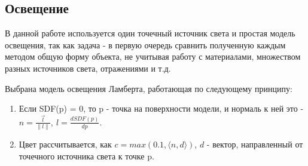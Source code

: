 \documentclass[a4paper,hidelinks,12pt]{article}
\begin{document}
\newpage

\subsection{Освещение}
В данной работе используется один точечный источник света и простая модель освещения, так как задача - в первую очередь сравнить полученную каждым методом общую форму
объекта, не учитывая работу с материалами, множеством разных источников света, отражениями и т.д.

\medskip

Выбрана модель освещения Ламберта, работающая по следующему принципу:
\begin{enumerate}[leftmargin=4em]
	\item Если SDF(p) = 0, то p - точка на поверхности модели, и нормаль к ней это - $n = \frac{\vec{l}}{\|l\|}, \ l = \frac{dSDF(p)}{dp}$.
	\item Цвет рассчитывается, как $c = max(0.1, \langle n, d \rangle)$, $d$ - вектор, направленный от точечного источника света к точке p.
\end{enumerate}
\end{document}
